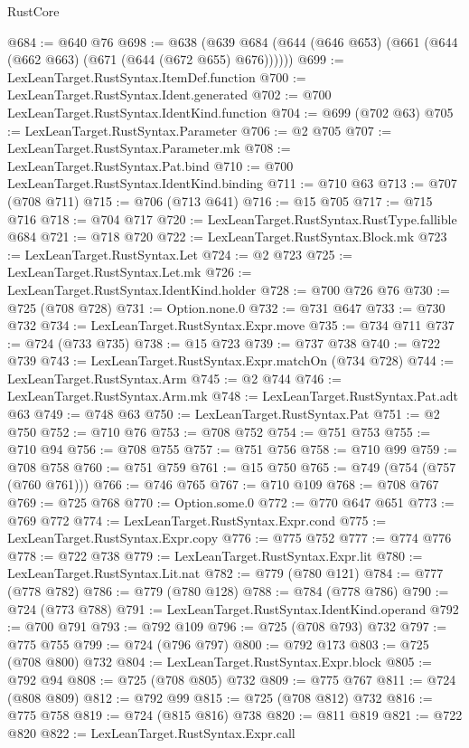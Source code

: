 \begin{lexlean}{RustCore}
\begin{coremodule}
@684 := @640 @76
@698 := @638 (@639 @684 (@644 (@646 @653) (@661 (@644 (@662 @663) (@671 (@644 (@672 @655) @676))))))
@699 := LexLeanTarget.RustSyntax.ItemDef.function
@700 := LexLeanTarget.RustSyntax.Ident.generated
@702 := @700 LexLeanTarget.RustSyntax.IdentKind.function
@704 := @699 (@702 @63)
@705 := LexLeanTarget.RustSyntax.Parameter
@706 := @2 @705
@707 := LexLeanTarget.RustSyntax.Parameter.mk
@708 := LexLeanTarget.RustSyntax.Pat.bind
@710 := @700 LexLeanTarget.RustSyntax.IdentKind.binding
@711 := @710 @63
@713 := @707 (@708 @711)
@715 := @706 (@713 @641)
@716 := @15 @705
@717 := @715 @716
@718 := @704 @717
@720 := LexLeanTarget.RustSyntax.RustType.fallible @684
@721 := @718 @720
@722 := LexLeanTarget.RustSyntax.Block.mk
@723 := LexLeanTarget.RustSyntax.Let
@724 := @2 @723
@725 := LexLeanTarget.RustSyntax.Let.mk
@726 := LexLeanTarget.RustSyntax.IdentKind.holder
@728 := @700 @726 @76
@730 := @725 (@708 @728)
@731 := Option.none.{0}
@732 := @731 @647
@733 := @730 @732
@734 := LexLeanTarget.RustSyntax.Expr.move
@735 := @734 @711
@737 := @724 (@733 @735)
@738 := @15 @723
@739 := @737 @738
@740 := @722 @739
@743 := LexLeanTarget.RustSyntax.Expr.matchOn (@734 @728)
@744 := LexLeanTarget.RustSyntax.Arm
@745 := @2 @744
@746 := LexLeanTarget.RustSyntax.Arm.mk
@748 := LexLeanTarget.RustSyntax.Pat.adt @63
@749 := @748 @63
@750 := LexLeanTarget.RustSyntax.Pat
@751 := @2 @750
@752 := @710 @76
@753 := @708 @752
@754 := @751 @753
@755 := @710 @94
@756 := @708 @755
@757 := @751 @756
@758 := @710 @99
@759 := @708 @758
@760 := @751 @759
@761 := @15 @750
@765 := @749 (@754 (@757 (@760 @761)))
@766 := @746 @765
@767 := @710 @109
@768 := @708 @767
@769 := @725 @768
@770 := Option.some.{0}
@772 := @770 @647 @651
@773 := @769 @772
@774 := LexLeanTarget.RustSyntax.Expr.cond
@775 := LexLeanTarget.RustSyntax.Expr.copy
@776 := @775 @752
@777 := @774 @776
@778 := @722 @738
@779 := LexLeanTarget.RustSyntax.Expr.lit
@780 := LexLeanTarget.RustSyntax.Lit.nat
@782 := @779 (@780 @121)
@784 := @777 (@778 @782)
@786 := @779 (@780 @128)
@788 := @784 (@778 @786)
@790 := @724 (@773 @788)
@791 := LexLeanTarget.RustSyntax.IdentKind.operand
@792 := @700 @791
@793 := @792 @109
@796 := @725 (@708 @793) @732
@797 := @775 @755
@799 := @724 (@796 @797)
@800 := @792 @173
@803 := @725 (@708 @800) @732
@804 := LexLeanTarget.RustSyntax.Expr.block
@805 := @792 @94
@808 := @725 (@708 @805) @732
@809 := @775 @767
@811 := @724 (@808 @809)
@812 := @792 @99
@815 := @725 (@708 @812) @732
@816 := @775 @758
@819 := @724 (@815 @816) @738
@820 := @811 @819
@821 := @722 @820
@822 := LexLeanTarget.RustSyntax.Expr.call

\end{coremodule}
\end{lexlean}

